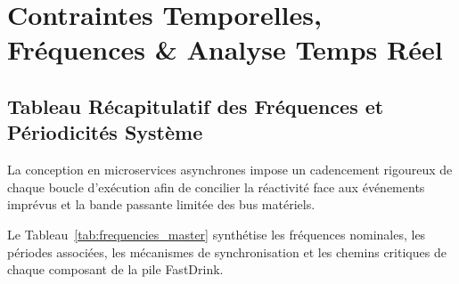 \chapter{Contraintes Temporelles, Fréquences \& Analyse Temps Réel}
\label{chap:realtime_timings}

\section{Tableau Récapitulatif des Fréquences et Périodicités Système}
La conception en microservices asynchrones impose un cadencement rigoureux de chaque boucle d'exécution afin de concilier la réactivité face aux événements imprévus et la bande passante limitée des bus matériels. 

Le Tableau~\ref{tab:frequencies_master} synthétise les fréquences nominales, les périodes associées, les mécanismes de synchronisation et les chemins critiques de chaque composant de la pile FastDrink.

